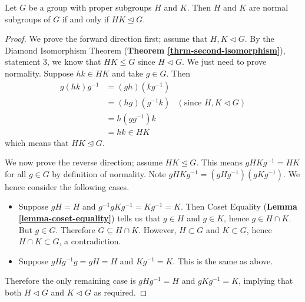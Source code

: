\begin{corollary}\label{corollary-subgroup-product-is-normal-subgroup-iff-subgroups-are-normal}
    Let $G$ be a group with proper subgroups $H$ and $K$. Then $H$ and $K$ are normal subgroups of $G$ if and only if $HK \unlhd G$.
\end{corollary}
\begin{proof}
    We prove the forward direction first; assume that $H, K \lhd G$. By the Diamond Isomorphism Theorem (\textbf{Theorem \ref{thrm-second-isomorphism}}), statement 3, we know that $HK \leq G$ since $H \lhd G$. We just need to prove normality. Suppose $hk \in HK$ and take $g \in G$. Then
    \begin{align*}
        g(hk)g^{-1} &= (gh)(kg^{-1})\\
        &= (hg)(g^{-1}k) & (\text{since } H, K \lhd G)\\
        &= h(gg^{-1})k\\
        &= hk \in HK
    \end{align*}
    which means that $HK \unlhd G$.

    We now prove the reverse direction; assume $HK \unlhd G$. This means $gHKg^{-1} = HK$ for all $g \in G$ by definition of normality. Note $gHKg^{-1} = (gHg^{-1})(gKg^{-1})$. We hence consider the following cases.
    \begin{itemize}
        \item Suppose $gH = H$ and $g^{-1}gKg^{-1} = Kg^{-1} = K$. Then Coset Equality (\textbf{Lemma \ref{lemma-coset-equality}}) tells us that $g \in H$ and $g \in K$, hence $g \in H \cap K$. But $g \in G$. Therefore $G \subseteq H \cap K$. However, $H \subset G$ and $K \subset G$, hence $H \cap K \subset G$, a contradiction.
        \item Suppose $gHg^{-1}g = gH = H$ and $Kg^{-1} = K$. This is the same as above.
    \end{itemize}
    Therefore the only remaining case is $gHg^{-1} = H$ and $gKg^{-1} = K$, implying that both $H \lhd G$ and $K \lhd G$ as required.
\end{proof}

